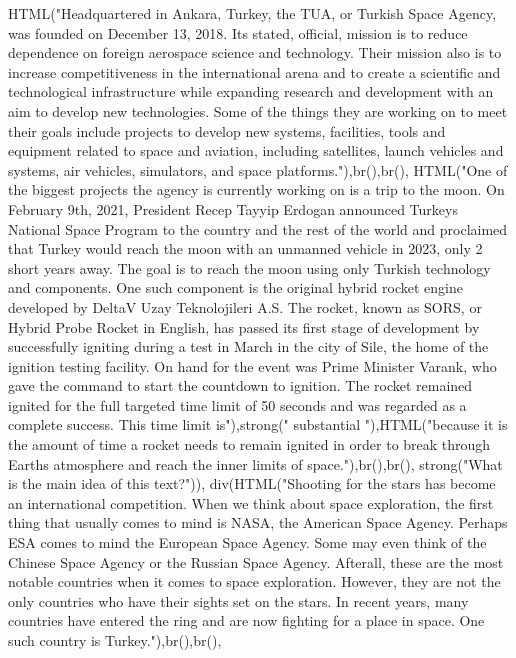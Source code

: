 \documentclass[
]{article}
\newenvironment{Shaded}{\begin{snugshade}}{\end{snugshade}}
\newcommand{\FunctionTok}[1]{\textcolor[rgb]{0.00,0.00,0.00}{#1}}
\newcommand{\NormalTok}[1]{#1}
\newcommand{\StringTok}[1]{\textcolor[rgb]{0.31,0.60,0.02}{#1}}
\begin{document}
\begin{Shaded}
\begin{Highlighting}[]
               \FunctionTok{HTML}\NormalTok{(}\StringTok{"Headquartered in Ankara, Turkey, the TUA, or Turkish Space Agency, was founded on December 13, 2018. Its stated, official, mission is to reduce dependence on foreign aerospace science and technology. Their mission also is to increase competitiveness in the international arena and to create a scientific and technological infrastructure while expanding research and development with an aim to develop new technologies. Some of the things they are working on to meet their goals include projects to develop new systems, facilities, tools and equipment related to space and aviation, including satellites, launch vehicles and systems, air vehicles, simulators, and space platforms."}\NormalTok{),}\FunctionTok{br}\NormalTok{(),}\FunctionTok{br}\NormalTok{(),}
               \FunctionTok{HTML}\NormalTok{(}\StringTok{"One of the biggest projects the agency is currently working on is a trip to the moon. On February 9th, 2021, President Recep Tayyip Erdogan announced Turkeys National Space Program to the country and the rest of the world and proclaimed that Turkey would reach the moon with an unmanned vehicle in 2023, only 2 short years away. The goal is to reach the moon using only Turkish technology and components. One such component is the original hybrid rocket engine developed by DeltaV Uzay Teknolojileri A.S. The rocket, known as SORS, or Hybrid Probe Rocket in English, has passed its first stage of development by successfully igniting during a test in March in the city of Sile, the home of the ignition testing facility. On hand for the event was Prime Minister Varank, who gave the command to start the countdown to ignition. The rocket remained ignited for the full targeted time limit of 50 seconds and was regarded as a complete success. This time limit is"}\NormalTok{),}\FunctionTok{strong}\NormalTok{(}\StringTok{" substantial "}\NormalTok{),}\FunctionTok{HTML}\NormalTok{(}\StringTok{"because it is the amount of time a rocket needs to remain ignited in order to break through Earths atmosphere and reach the inner limits of space."}\NormalTok{),}\FunctionTok{br}\NormalTok{(),}\FunctionTok{br}\NormalTok{(),}
               \FunctionTok{strong}\NormalTok{(}\StringTok{"What is the main idea of this text?"}\NormalTok{)),}
           \FunctionTok{div}\NormalTok{(}\FunctionTok{HTML}\NormalTok{(}\StringTok{"Shooting for the stars has become an international competition. When we think about space exploration, the first thing that usually comes to mind is NASA, the American Space Agency. Perhaps ESA comes to mind  the European Space Agency. Some may even think of the Chinese Space Agency or the Russian Space Agency. Afterall, these are the most notable countries when it comes to space exploration. However, they are not the only countries who have their sights set on the stars. In recent years, many countries have entered the ring and are now fighting for a place in space. One such country is Turkey."}\NormalTok{),}\FunctionTok{br}\NormalTok{(),}\FunctionTok{br}\NormalTok{(), }

\end{Highlighting}
\end{Shaded}
\end{document}
